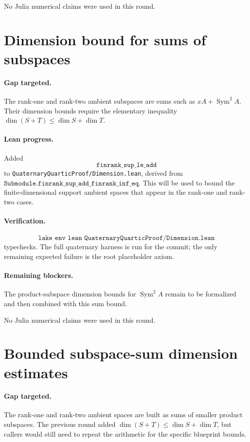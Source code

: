 \documentclass[11pt]{article}
\begin{document}
No Julia numerical claims were used in this round.

\section*{Dimension bound for sums of subspaces}

\paragraph{Gap targeted.}
The rank-one and rank-two ambient subspaces are sums such as
\(xA+\operatorname{Sym}^2 A\).  Their dimension bounds require the elementary
inequality \(\dim(S+T)\le\dim S+\dim T\).

\paragraph{Lean progress.}
Added
\[
\texttt{finrank\_sup\_le\_add}
\]
to \texttt{QuaternaryQuarticProof/Dimension.lean}, derived from
\(\texttt{Submodule.finrank\_sup\_add\_finrank\_inf\_eq}\).  This will be used
to bound the finite-dimensional support ambient spaces that appear in the
rank-one and rank-two cases.

\paragraph{Verification.}
\[
\texttt{lake env lean QuaternaryQuarticProof/Dimension.lean}
\]
typechecks.  The full quaternary harness is run for the commit; the only
remaining expected failure is the root placeholder axiom.

\paragraph{Remaining blockers.}
The product-subspace dimension bounds for \(\operatorname{Sym}^2 A\) remain to
be formalized and then combined with this sum bound.

No Julia numerical claims were used in this round.

\section*{Bounded subspace-sum dimension estimates}

\paragraph{Gap targeted.}
The rank-one and rank-two ambient spaces are built as sums of smaller product
subspaces.  The previous round added \(\dim(S+T)\le\dim S+\dim T\), but callers
would still need to repeat the arithmetic for the specific blueprint bounds.
\end{document}
